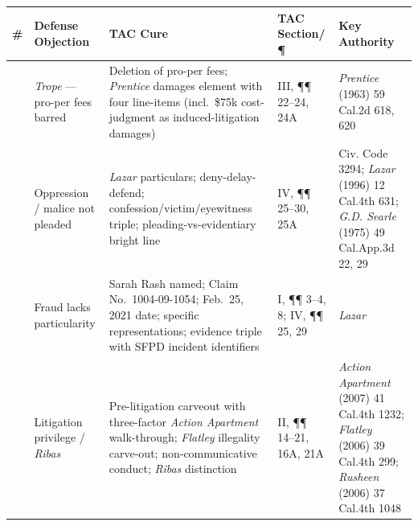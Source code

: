 {\def\LTcaptype{table} %
\begin{longtable}[]{@{}
  >{\raggedright\arraybackslash}p{}
  >{\raggedright\arraybackslash}p{}
  >{\raggedright\arraybackslash}p{}
  >{\raggedright\arraybackslash}p{}
  >{\raggedright\arraybackslash}p{}@{}}
\toprule\noalign{}
\begin{minipage}[b]{\linewidth}\raggedright
\#
\end{minipage} & \begin{minipage}[b]{\linewidth}\raggedright
Defense Objection
\end{minipage} & \begin{minipage}[b]{\linewidth}\raggedright
TAC Cure
\end{minipage} & \begin{minipage}[b]{\linewidth}\raggedright
TAC Section/¶
\end{minipage} & \begin{minipage}[b]{\linewidth}\raggedright
Key Authority
\end{minipage} \\
\midrule\noalign{}
\endhead
\bottomrule\noalign{}
\endlastfoot
1 & \emph{Trope} --- pro-per fees barred & Deletion of pro-per fees; \emph{Prentice} damages element with four line-items (incl.~\$75k cost-judgment as induced-litigation damages) & \textsection{}III, ¶¶ 22--24, 24A & \emph{Prentice} (1963) 59 Cal.2d 618, 620 \\
2 & Oppression / malice not pleaded & \emph{Lazar} particulars; deny-delay-defend; confession/victim/eyewitness triple; pleading-vs-evidentiary bright line & \textsection{}IV, ¶¶ 25--30, 25A & Civ. Code \textsection{} 3294; \emph{Lazar} (1996) 12 Cal.4th 631; \emph{G.D. Searle} (1975) 49 Cal.App.3d 22, 29 \\
3 & Fraud lacks particularity & Sarah Rash named; Claim No.~1004-09-1054; Feb.~25, 2021 date; specific representations; evidence triple with SFPD incident identifiers & \textsection{}I, ¶¶ 3--4, 8; \textsection{}IV, ¶¶ 25, 29 & \emph{Lazar} \\
4 & Litigation privilege / \emph{Ribas} & Pre-litigation carveout with three-factor \emph{Action Apartment} walk-through; \emph{Flatley} illegality carve-out; non-communicative conduct; \emph{Ribas} distinction & \textsection{}II, ¶¶ 14--21, 16A, 21A & \emph{Action Apartment} (2007) 41 Cal.4th 1232; \emph{Flatley} (2006) 39 Cal.4th 299; \emph{Rusheen} (2006) 37 Cal.4th 1048 \\

\end{longtable}}
